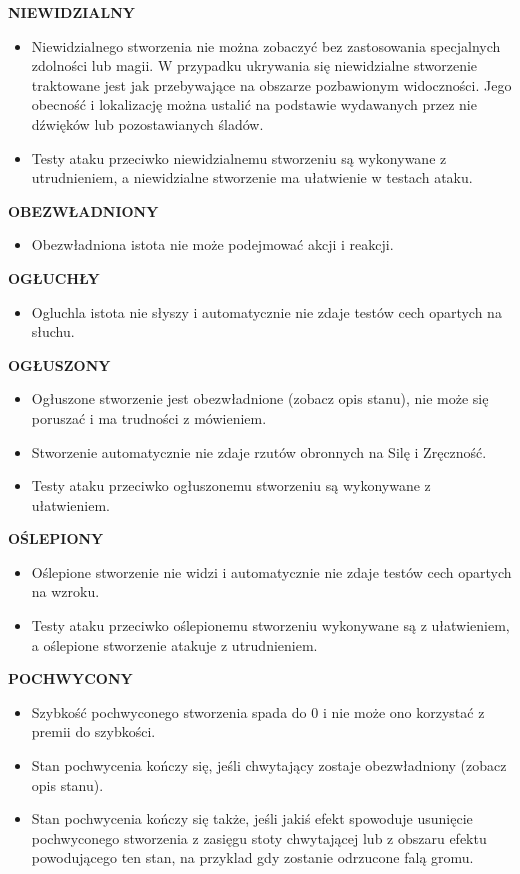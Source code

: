 \documentclass[14pt]{article}
\begin{document}
\textbf{NIEWIDZIALNY}
\begin{itemize}
    \item Niewidzialnego stworzenia nie można zobaczyć bez zastosowania specjalnych zdolności lub magii. W przypadku ukrywania się niewidzialne stworzenie traktowane jest jak przebywające na obszarze pozbawionym widoczności. Jego obecność i lokalizację można ustalić na podstawie wydawanych przez nie dźwięków lub pozostawianych śladów.
    \item Testy ataku przeciwko niewidzialnemu stworzeniu są wykonywane z utrudnieniem, a niewidzialne stworzenie ma ułatwienie w testach ataku.
\end{itemize}

\textbf{OBEZWŁADNIONY}
\begin{itemize}
    \item Obezwładniona istota nie może podejmować akcji i reakcji.
\end{itemize}

\textbf{OGŁUCHŁY}
\begin{itemize}
    \item Ogluchla istota nie słyszy i automatycznie nie zdaje testów cech opartych na słuchu.
\end{itemize}

\textbf{OGŁUSZONY}
\begin{itemize}
    \item Ogłuszone stworzenie jest obezwładnione (zobacz opis stanu), nie może się poruszać i ma trudności z mówieniem.
    \item Stworzenie automatycznie nie zdaje rzutów obronnych na Silę i Zręczność.
    \item Testy ataku przeciwko ogłuszonemu stworzeniu są wykonywane z ułatwieniem.
\end{itemize}
\newpage

\textbf{OŚLEPIONY}
\begin{itemize}
    \item Oślepione stworzenie nie widzi i automatycznie nie zdaje testów cech opartych na wzroku.
    \item Testy ataku przeciwko oślepionemu stworzeniu wykonywane są z ułatwieniem, a oślepione stworzenie atakuje z utrudnieniem.
\end{itemize}

\textbf{POCHWYCONY}
\begin{itemize}
    \item Szybkość pochwyconego stworzenia spada do 0 i nie może ono korzystać z premii do szybkości.
    \item Stan pochwycenia kończy się, jeśli chwytający zostaje obezwładniony (zobacz opis stanu).
    \item Stan pochwycenia kończy się także, jeśli jakiś efekt spowoduje usunięcie pochwyconego stworzenia z zasięgu stoty chwytającej lub z obszaru efektu powodującego ten stan, na przyklad gdy zostanie odrzucone falą gromu.
\end{itemize}
\end{document}
